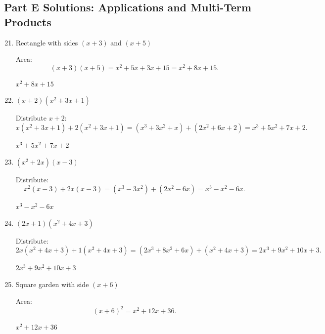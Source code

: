 \documentclass[14pt]{extarticle}
\begin{document}
\subsection*{Part E Solutions: Applications and Multi-Term Products}
\begin{enumerate}
  \setcounter{enumi}{20}
  \item Rectangle with sides \((x + 3)\) and \((x + 5)\)

  Area:
  \[
  (x + 3)(x + 5)
  = x^2 + 5x + 3x + 15
  = x^2 + 8x + 15.
  \]

  \(\boxed{x^2 + 8x + 15}\)

  \item \((x + 2)(x^2 + 3x + 1)\)

  Distribute \(x + 2\):
  \[
  x(x^2 + 3x + 1) + 2(x^2 + 3x + 1)
  = (x^3 + 3x^2 + x) + (2x^2 + 6x + 2)
  = x^3 + 5x^2 + 7x + 2.
  \]

  \(\boxed{x^3 + 5x^2 + 7x + 2}\)

  \item \((x^2 + 2x)(x - 3)\)

  Distribute:
  \[
  x^2(x - 3) + 2x(x - 3)
  = (x^3 - 3x^2) + (2x^2 - 6x)
  = x^3 - x^2 - 6x.
  \]

  \(\boxed{x^3 - x^2 - 6x}\)

  \item \((2x + 1)(x^2 + 4x + 3)\)

  Distribute:
  \[
  2x(x^2 + 4x + 3) + 1(x^2 + 4x + 3)
  = (2x^3 + 8x^2 + 6x) + (x^2 + 4x + 3)
  = 2x^3 + 9x^2 + 10x + 3.
  \]

  \(\boxed{2x^3 + 9x^2 + 10x + 3}\)

  \item Square garden with side \((x + 6)\)

  Area:
  \[
  (x + 6)^2 = x^2 + 12x + 36.
  \]

  \(\boxed{x^2 + 12x + 36}\)
\end{enumerate}



\end{document}
